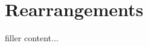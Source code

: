 \documentclass[../../templates/section]{subfiles}
\begin{document}
\section{Rearrangements}\label{sec:rearrangements}

filler content...
\end{document}
